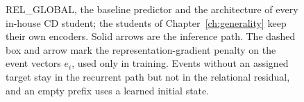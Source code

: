\begin{figure}[tb]
\caption[REL\_GLOBAL, the baseline predictor]{REL\_GLOBAL, the baseline predictor and the architecture of every
in-house CD student; the students of Chapter~\ref{ch:generality} keep their
own encoders. Solid arrows are the inference path. The dashed box and arrow
mark the representation-gradient penalty on the event vectors $e_i$, used
only in training. Events without an assigned target stay in the recurrent
path but not in the relational residual, and an empty prefix uses a learned
initial state.}
\label{fig:relglobal}
\end{figure}
